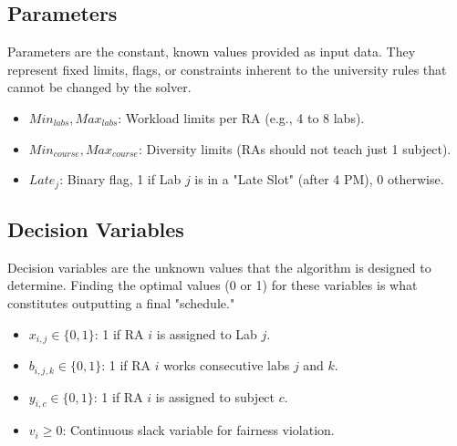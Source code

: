 \documentclass[journal,onecolumn]{IEEEtran}
\begin{document}
\subsection{Parameters}
Parameters are the constant, known values provided as input data. They represent fixed limits, flags, or constraints inherent to the university rules that cannot be changed by the solver.
\begin{itemize}
    \item $Min_{labs}, Max_{labs}$: Workload limits per RA (e.g., 4 to 8 labs).
    \item $Min_{course}, Max_{course}$: Diversity limits (RAs should not teach just 1 subject).
    \item $Late_j$: Binary flag, 1 if Lab $j$ is in a "Late Slot" (after 4 PM), 0 otherwise.
\end{itemize}

\subsection{Decision Variables}
Decision variables are the unknown values that the algorithm is designed to determine. Finding the optimal values (0 or 1) for these variables is what constitutes outputting a final "schedule."
\begin{itemize}
    \item $x_{i,j} \in \{0,1\}$: 1 if RA $i$ is assigned to Lab $j$.
    \item $b_{i,j,k} \in \{0,1\}$: 1 if RA $i$ works consecutive labs $j$ and $k$.
    \item $y_{i,c} \in \{0,1\}$: 1 if RA $i$ is assigned to subject $c$.
    \item $v_i \ge 0$: Continuous slack variable for fairness violation.
\end{itemize}
\end{document}

